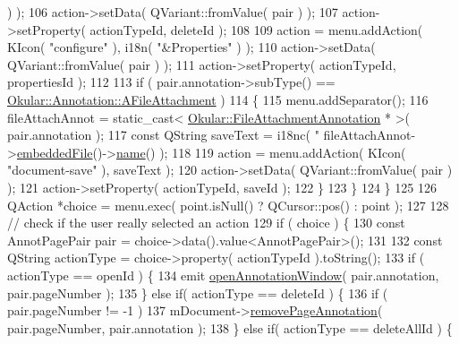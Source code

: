 \begin{DoxyCode}
{{      ) );
106             action->setData( QVariant::fromValue( pair ) );
107             action->setProperty( actionTypeId, deleteId );
108 
109             action = menu.addAction( KIcon( \textcolor{stringliteral}{"configure"} ), i18n( \textcolor{stringliteral}{"&Properties"} ) );
110             action->setData( QVariant::fromValue( pair ) );
111             action->setProperty( actionTypeId, propertiesId );
112 
113             \textcolor{keywordflow}{if} ( pair.annotation->subType() == 
      \hyperlink{classOkular_1_1Annotation_af71b46e37d5f850b97d5c4de3be9aac0a7209cbfb5e13c0f80ac36f87c9575836}{Okular::Annotation::AFileAttachment} )
114             \{
115                 menu.addSeparator();
116                 fileAttachAnnot = \textcolor{keyword}{static\_cast<} \hyperlink{classOkular_1_1FileAttachmentAnnotation}{Okular::FileAttachmentAnnotation}
       * \textcolor{keyword}{>}( pair.annotation );
117                 \textcolor{keyword}{const} QString saveText = i18nc( \textcolor{stringliteral}{"%
      fileAttachAnnot->\hyperlink{classOkular_1_1FileAttachmentAnnotation_a22ff85c689647a6daa6bac053fe60cbb}{embeddedFile}()->\hyperlink{classOkular_1_1EmbeddedFile_a70fcfea705979ce6a31b989fc92a8f2b}{name}() );
118 
119                 action = menu.addAction( KIcon( \textcolor{stringliteral}{"document-save"} ), saveText );
120                 action->setData( QVariant::fromValue( pair ) );
121                 action->setProperty( actionTypeId, saveId );
122             \}
123         \}
124     \}
125 
126     QAction *choice = menu.exec( point.isNull() ? QCursor::pos() : point );
127 
128     \textcolor{comment}{// check if the user really selected an action}
129     \textcolor{keywordflow}{if} ( choice ) \{
130         \textcolor{keyword}{const} AnnotPagePair pair = choice->data().value<AnnotPagePair>();
131 
132         \textcolor{keyword}{const} QString actionType = choice->property( actionTypeId ).toString();
133         \textcolor{keywordflow}{if} ( actionType == openId ) \{
134             emit \hyperlink{classAnnotationPopup_a2f542d2aa2c7cc85b4bc9045be5adcc9}{openAnnotationWindow}( pair.annotation, pair.pageNumber );
135         \} \textcolor{keywordflow}{else} \textcolor{keywordflow}{if}( actionType == deleteId ) \{
136             \textcolor{keywordflow}{if} ( pair.pageNumber != -1 )
137                 mDocument->\hyperlink{classOkular_1_1Document_af8ae711ce34ff903a589423e73a45cbb}{removePageAnnotation}( pair.pageNumber, pair.annotation );
138         \} \textcolor{keywordflow}{else} \textcolor{keywordflow}{if}( actionType == deleteAllId ) \{
}}}
\end{DoxyCode}
